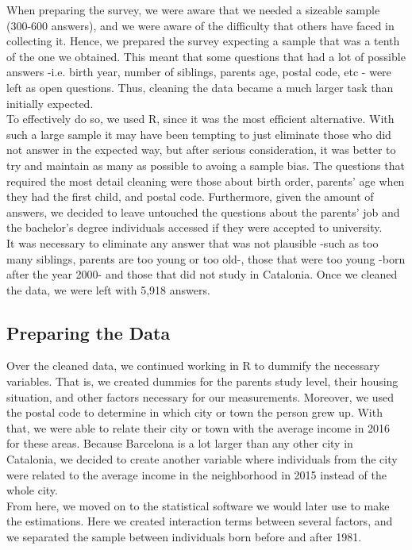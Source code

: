 \documentclass[12pt]{article}
\begin{document}
When preparing the survey, we were aware that we needed a sizeable sample (300-600 answers), and we were aware of the difficulty that others have faced in collecting it. Hence, we prepared the survey expecting a sample that was a tenth of the one we obtained. This meant that some questions that had a lot of possible answers -i.e. birth year, number of siblings, parents age, postal code, etc - were left as open questions. Thus, cleaning the data became a much larger task than initially expected. \\
To effectively do so, we used R, since it was the most efficient alternative. With such a large sample it may have been tempting to just eliminate those who did not answer in the expected way, but after serious consideration, it was better to try and maintain as many as possible to avoing a sample bias. The questions that required the most detail cleaning were those about birth order, parents' age when they had the first child, and postal code. Furthermore, given the amount of answers, we decided to leave untouched the questions about the parents' job and the bachelor's degree individuals accessed if they were accepted to university. \\
It was necessary to eliminate any answer that was not plausible -such as too many siblings, parents are too young or too old-, those that were too young -born after the year 2000- and those that did not study in Catalonia. Once we cleaned the data, we were left with 5,918 answers.

\subsection{Preparing the Data}

Over the cleaned data, we continued working in R to dummify the necessary variables. That is, we created dummies for the parents study level, their housing situation, and other factors necessary for our measurements. Moreover, we used the postal code to determine in which city or town the person grew up. With that, we were able to relate their city or town with the average income in 2016 for these areas. Because Barcelona is a lot larger than any other city in Catalonia, we decided to create another variable where individuals from the city were related to the average income in the neighborhood in 2015 instead of the whole city.\\
From here, we moved on to the statistical software we would later use to make the estimations. Here we created interaction terms between several factors, and we separated the sample between individuals born before and after 1981. \\
\end{document}
